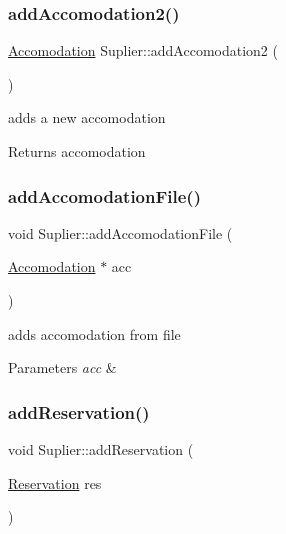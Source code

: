 \subsubsection{\texorpdfstring{add\+Accomodation2()}{addAccomodation2()}}
{\footnotesize\ttfamily \hyperlink{class_accomodation}{Accomodation} Suplier\+::add\+Accomodation2 (\begin{DoxyParamCaption}{ }\end{DoxyParamCaption})}



adds a new accomodation 

\begin{DoxyReturn}{Returns}
accomodation 
\end{DoxyReturn}
\hypertarget{class_suplier_a817ef61f9a01bd480073448f1e382061}{}\label{class_suplier_a817ef61f9a01bd480073448f1e382061} 
\subsubsection{\texorpdfstring{add\+Accomodation\+File()}{addAccomodationFile()}}
{\footnotesize\ttfamily void Suplier\+::add\+Accomodation\+File (\begin{DoxyParamCaption}\item[{\hyperlink{class_accomodation}{Accomodation} $\ast$}]{acc }\end{DoxyParamCaption})}



adds accomodation from file 


\begin{DoxyParams}{Parameters}
{\em acc} & \\
\hline
\end{DoxyParams}
\hypertarget{class_suplier_a2449d37d77317ea100c3d2866f8c8556}{}\label{class_suplier_a2449d37d77317ea100c3d2866f8c8556} 
\subsubsection{\texorpdfstring{add\+Reservation()}{addReservation()}}
{\footnotesize\ttfamily void Suplier\+::add\+Reservation (\begin{DoxyParamCaption}\item[{\hyperlink{class_reservation}{Reservation}}]{res }\end{DoxyParamCaption})}



